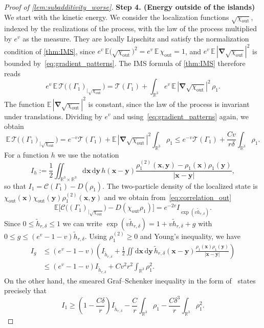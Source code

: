 \documentclass[final,reqno]{amsart}
\theoremstyle{remark}
\renewcommand{\le}{\leqslant}
\renewcommand{\ge}{\geqslant}
\newcommand{\wt}[1]{\widetilde{#1}}
\newcommand{\RR}{\mathbb{R}}
\newcommand{\EE}{\mathbb{E}}
\newcommand{\grad}{\bm{\nabla}}
\newcommand{\dd}{\mathrm{d}}
\newcommand{\TC}{\mathcal{T}}
\newcommand{\Cc}{\mathcal{C}}
\begin{document}
\begin{proof}[Proof of \cref{lem:subadditivity_worse}]
\medskip

\noindent\textbf{Step 4. (Energy outside of the islands)} We start with the kinetic energy. We consider the localization functions $\sqrt{\chi_{\mathrm{out}}}$, indexed by the realizations of the process, with the law of the process multiplied by $e^{v}$ as the measure. They are locally Lipschitz and satisfy the normalization condition of \cref{thm:IMS}, since $e^{v}\,\EE\big(\sqrt{\chi_{\mathrm{out}}}\big)^2=e^{v}\,\EE\,\chi_{\mathrm{out}}=1$, and $e^{v}\,\EE\,|\grad\sqrt{\chi_{\mathrm{out}}}|^2$ is bounded by~\cref{eq:gradient_patterns}. The IMS formula of \cref{thm:IMS} therefore reads
$$
e^{v}\,\EE\,\TC\big((\Gamma_1)_{|\sqrt{\chi_{\mathrm{out}}}}\big)=\TC(\Gamma_1)+\int_{\RR^3}e^{v}\,\EE\,|\grad\sqrt{\chi_{\mathrm{out}}}|^2\,\rho_1.
$$
The function $\EE\,|\grad\sqrt{\chi_{\mathrm{out}}}|^2$ is constant, since the law of the process is invariant under translations. Dividing by $e^{v}$ and using~\cref{eq:gradient_patterns} again, we obtain
$$
\EE\,\TC\big((\Gamma_1)_{|\sqrt{\chi_{\mathrm{out}}}}\big)=e^{-v}\TC(\Gamma_1)+\EE\,|\grad\sqrt{\chi_{\mathrm{out}}}|^2\int_{\RR^3}\rho_1\le e^{-v}\TC(\Gamma_1)+\frac{Cv}{r\delta}\int_{\RR^3}\rho_1.
$$
For a function $h$ we use the notation
$$
I_h:=\frac12\iint_{\RR^3\times\RR^3}\dd\mathbf{x}\,\dd\mathbf{y}\,h(\mathbf{x}-\mathbf{y})\frac{\rho_1^{(2)}(\mathbf{x},\mathbf{y})-\rho_1(\mathbf{x})\rho_1(\mathbf{y})}{|\mathbf{x}-\mathbf{y}|},
$$
so that $I_1=\Cc(\Gamma_1)-D(\rho_1)$. The two-particle density of the localized state is $\chi_{\mathrm{out}}(\mathbf{x})\chi_{\mathrm{out}}(\mathbf{y})\rho_1^{(2)}(\mathbf{x},\mathbf{y})$ and we obtain from~\cref{eq:correlation_out}
$$
\EE\Big[\Cc\big((\Gamma_1)_{|\sqrt{\chi_{\mathrm{out}}}}\big)-D(\chi_{\mathrm{out}}\rho_1)\Big]=e^{-2v}I_{\exp(v\wt{h}_{r,\delta})}.
$$
Since $0\le\wt{h}_{r,\delta}\le1$ we can write $\exp(v\wt{h}_{r,\delta})=1+v\wt{h}_{r,\delta}+g$ with $0\le g\le(e^v-1-v)\wt{h}_{r,\delta}$. Using $\rho_1^{(2)}\ge0$ and Young's inequality, we have
\begin{align*}
I_g&\le(e^v-1-v)\left(I_{\wt{h}_{r,\delta}}+\frac12\iint\dd\mathbf{x}\,\dd\mathbf{y}\,\wt{h}_{r,\delta}(\mathbf{x}-\mathbf{y})\frac{\rho_1(\mathbf{x})\rho_1(\mathbf{y})}{|\mathbf{x}-\mathbf{y}|}\right)\\
&\le (e^v-1-v)I_{\wt{h}_{r,\delta}}+Cv^2r^2\int_{\RR^3}\rho_1^2.
\end{align*}
On the other hand, the smeared Graf--Schenker inequality in the form of~\cite[Eq. (53)]{lewin2020local} states precisely that
$$
I_1\ge\left(1-\frac{C\delta}{r}\right)I_{\wt{h}_{r,\delta}}-\frac{C}{r}\int_{\RR^3}\rho_1-\frac{C\delta^3}{r}\int_{\RR^3}\rho_1^2.
$$
\end{proof}
\end{document}
